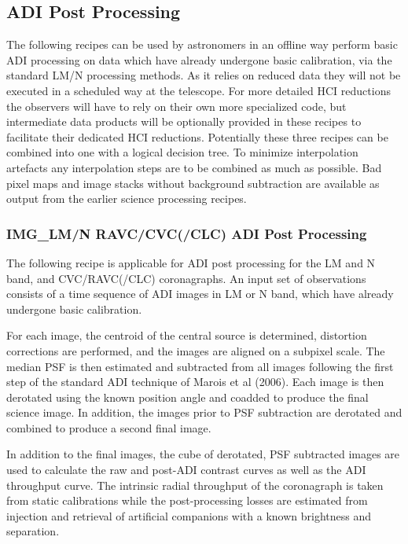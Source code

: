 
\subsection{ADI Post Processing}
\label{}



The following recipes can be used by astronomers in an offline way
perform basic ADI processing on data which have already undergone
basic calibration, via the standard LM/N processing methods.  As it
relies on reduced data they will not be executed in a scheduled way at
the telescope. For more detailed HCI reductions the observers will
have to rely on their own more specialized code, but intermediate data
products will be optionally provided in these recipes to facilitate
their dedicated HCI reductions. Potentially these three recipes can be combined into one with a logical decision tree. To minimize interpolation artefacts any interpolation steps are to be combined as much as possible. Bad pixel maps and image stacks without background subtraction are available as output from the earlier science processing recipes.

\subsubsection{IMG\_LM/N RAVC/CVC(/CLC) ADI Post Processing}
\label{}


The following recipe is applicable for ADI post processing for the LM
and N band, and CVC/RAVC(/CLC) coronagraphs. An input set of
observations consists of a time sequence of ADI images in LM or N band, which have already undergone basic calibration.

For each image, the centroid of the central source is determined, distortion corrections are performed, and the images are aligned on a subpixel scale. The median PSF is then estimated and subtracted from all images following the first step of the standard ADI technique of Marois et al (2006). 
Each image is then derotated using the known position angle and coadded to produce the final science image. In addition, the images prior to PSF subtraction are derotated and combined to produce a second final image.

In addition to the final images, the cube of derotated, PSF subtracted images are used to calculate the raw and post-ADI contrast curves as well as the ADI throughput curve. The intrinsic radial throughput of the coronagraph  is taken from static calibrations while the post-processing losses are estimated from injection and retrieval of artificial companions with a known brightness and separation.

